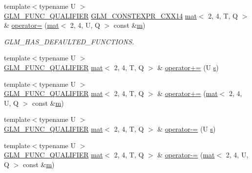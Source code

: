 \begin{DoxyCompactItemize}
{\footnotesize template$<$typename U $>$ }\\\mbox{\hyperlink{setup_8hpp_a33fdea6f91c5f834105f7415e2a64407}{G\+L\+M\+\_\+\+F\+U\+N\+C\+\_\+\+Q\+U\+A\+L\+I\+F\+I\+ER}} \mbox{\hyperlink{setup_8hpp_a4dd12abf5e1164bc57f3a34671d03844}{G\+L\+M\+\_\+\+C\+O\+N\+S\+T\+E\+X\+P\+R\+\_\+\+C\+X\+X14}} \mbox{\hyperlink{structglm_1_1mat}{mat}}$<$ 2, 4, T, Q $>$ \& \mbox{\hyperlink{structglm_1_1mat_3_012_00_014_00_01_t_00_01_q_01_4_a19be71908044d2aa85169d495b738c8f}{operator=}} (\mbox{\hyperlink{structglm_1_1mat}{mat}}$<$ 2, 4, U, Q $>$ const \&\mbox{\hyperlink{_s_d_l__opengl__glext_8h_af593500c283bf1a787a6f947f503a5c2}{m}})
\begin{DoxyCompactList}\small\item\em G\+L\+M\+\_\+\+H\+A\+S\+\_\+\+D\+E\+F\+A\+U\+L\+T\+E\+D\+\_\+\+F\+U\+N\+C\+T\+I\+O\+NS. \end{DoxyCompactList}\item 
{\footnotesize template$<$typename U $>$ }\\\mbox{\hyperlink{setup_8hpp_a33fdea6f91c5f834105f7415e2a64407}{G\+L\+M\+\_\+\+F\+U\+N\+C\+\_\+\+Q\+U\+A\+L\+I\+F\+I\+ER}} \mbox{\hyperlink{structglm_1_1mat}{mat}}$<$ 2, 4, T, Q $>$ \& \mbox{\hyperlink{structglm_1_1mat_3_012_00_014_00_01_t_00_01_q_01_4_a2a7667a3e13a109fc7feef253654b9a7}{operator+=}} (U \mbox{\hyperlink{_s_d_l__opengl_8h_a4af680a6c683f88ed67b76f207f2e6e4}{s}})
\item 
{\footnotesize template$<$typename U $>$ }\\\mbox{\hyperlink{setup_8hpp_a33fdea6f91c5f834105f7415e2a64407}{G\+L\+M\+\_\+\+F\+U\+N\+C\+\_\+\+Q\+U\+A\+L\+I\+F\+I\+ER}} \mbox{\hyperlink{structglm_1_1mat}{mat}}$<$ 2, 4, T, Q $>$ \& \mbox{\hyperlink{structglm_1_1mat_3_012_00_014_00_01_t_00_01_q_01_4_a44465daad3626301801fa9ebcf9f07d0}{operator+=}} (\mbox{\hyperlink{structglm_1_1mat}{mat}}$<$ 2, 4, U, Q $>$ const \&\mbox{\hyperlink{_s_d_l__opengl__glext_8h_af593500c283bf1a787a6f947f503a5c2}{m}})
\item 
{\footnotesize template$<$typename U $>$ }\\\mbox{\hyperlink{setup_8hpp_a33fdea6f91c5f834105f7415e2a64407}{G\+L\+M\+\_\+\+F\+U\+N\+C\+\_\+\+Q\+U\+A\+L\+I\+F\+I\+ER}} \mbox{\hyperlink{structglm_1_1mat}{mat}}$<$ 2, 4, T, Q $>$ \& \mbox{\hyperlink{structglm_1_1mat_3_012_00_014_00_01_t_00_01_q_01_4_a341e3a7ac4ef80473285d574b8e86849}{operator-\/=}} (U \mbox{\hyperlink{_s_d_l__opengl_8h_a4af680a6c683f88ed67b76f207f2e6e4}{s}})
\item 
{\footnotesize template$<$typename U $>$ }\\\mbox{\hyperlink{setup_8hpp_a33fdea6f91c5f834105f7415e2a64407}{G\+L\+M\+\_\+\+F\+U\+N\+C\+\_\+\+Q\+U\+A\+L\+I\+F\+I\+ER}} \mbox{\hyperlink{structglm_1_1mat}{mat}}$<$ 2, 4, T, Q $>$ \& \mbox{\hyperlink{structglm_1_1mat_3_012_00_014_00_01_t_00_01_q_01_4_adf8786e77c3b21c8436cd0b7aa921803}{operator-\/=}} (\mbox{\hyperlink{structglm_1_1mat}{mat}}$<$ 2, 4, U, Q $>$ const \&\mbox{\hyperlink{_s_d_l__opengl__glext_8h_af593500c283bf1a787a6f947f503a5c2}{m}})

\end{DoxyCompactItemize}
